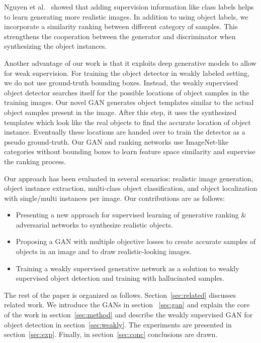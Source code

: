 \documentclass[runningheads]{llncs}
\begin{document}
Nguyen et al.~\cite{nguyen} showed that adding supervision information like class labels helps to learn generating more realistic images. In addition to using object labels, we incorporate a similarity ranking between different category of samples. This strengthens the cooperation between the generator and discriminator when synthesizing the object instances.

Another advantage of our work is that it exploits deep generative models to allow for weak supervision. For training the object detector in weakly labeled setting, we do not use ground-truth bounding boxes. Instead, the weakly supervised object detector searches itself for the possible locations of object samples in the training images. Our novel GAN generates object templates similar to the actual object samples present in the image. After this step, it uses the synthesized templates which look like the real objects to find the accurate location of object instance. Eventually these locations are handed over to train the detector as a pseudo ground-truth. Our GAN and ranking networks use ImageNet-like categories without bounding boxes to learn feature space similarity and supervise the ranking process.

Our approach has been evaluated in several scenarios: realistic image generation, object instance extraction, multi-class object classification, and object localization with single/multi instances per image. Our contributions are as follows:
\begin{itemize}
  \item Presenting a new approach for supervised learning of generative ranking \& adversarial networks to synthesize realistic objects.
  \item Proposing a GAN with multiple objective losses to create accurate samples of objects in an image and to draw realistic-looking images.
  \item Training a weakly supervised generative network as a solution to weakly supervised object detection and training with hallucinated samples.
\end{itemize}
The rest of the paper is organized as follows. Section~\ref{sec:related} discusses related work. We introduce the GANs in section ~\ref{sec:gan} and  explain the core of the work in section~\ref{sec:method} and describe the weakly supervised GAN for object detection in section~\ref{sec:weakly}. The experiments are presented in section~\ref{sec:exp}. Finally,  in section~\ref{sec:conc} conclusions are drawn. 
\end{document}
